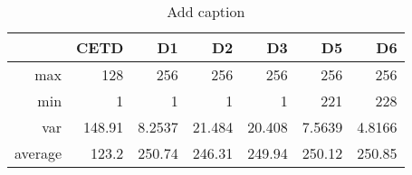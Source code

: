 \begin{table}[htbp]
  \centering
  \caption{Add caption}
    \begin{tabular}{rrrrrrr}
    \toprule
          & CETD  & D1    & D2    & D3    & D5    & D6 \\
    \midrule
    max   & 128   & 256   & 256   & 256   & 256   & 256 \\
    min   & 1     & 1     & 1     & 1     & 221   & 228 \\
    var   & 148.91 & 8.2537 & 21.484 & 20.408 & 7.5639 & 4.8166 \\
    average & 123.2 & 250.74 & 246.31 & 249.94 & 250.12 & 250.85 \\
    \bottomrule
    \end{tabular}%
  \label{tab:addlabel}%
\end{table}%

